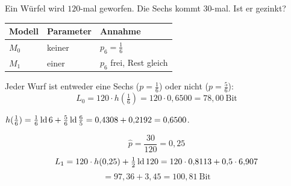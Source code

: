 \begin{aufgabe}
\begin{center}
\begin{minipage}{0.88\textwidth}
\end{minipage}
\end{center}
\end{aufgabe}

\begin{aufgabe}
Ein Würfel wird $120$-mal geworfen. Die Sechs kommt $30$-mal. Ist er gezinkt?

\loesung
{}
\begin{center}
{\small
\renewcommand{\arraystretch}{1.5}
\begin{tabular}{@{}P{2.2cm}P{2.4cm}P{3.4cm}@{}}
\toprule
\textbf{Modell} & \textbf{Parameter} & \textbf{Annahme}\\
\midrule
$M_0$ & keiner & $p_6 = \tfrac16$\\
$M_1$ & einer & $p_6$ frei, Rest gleich\\
\bottomrule
\end{tabular}}
\end{center}

Jeder Wurf ist entweder eine Sechs ($p=\frac16$) oder nicht ($p=\frac56$):
\[ L_0 = 120\cdot h\!\left(\tfrac16\right) = 120\cdot0{,}6500 = 78{,}00 \ \text{Bit} \]

 $h(\frac16) = \frac16\operatorname{ld}6 + \frac56\operatorname{ld}\frac65 = 0{,}4308 + 0{,}2192 = 0{,}6500$.

\begin{center}
\begin{minipage}{0.86\textwidth}
\end{minipage}
\end{center}

\[ \hat p = \frac{30}{120} = 0{,}25 \]
\[ L_1 = 120\cdot h(0{,}25) + \tfrac12\operatorname{ld} 120 = 120\cdot0{,}8113 + 0{,}5\cdot6{,}907 \]
\[ = 97{,}36 + 3{,}45 = 100{,}81 \ \text{Bit} \]


\end{aufgabe}
